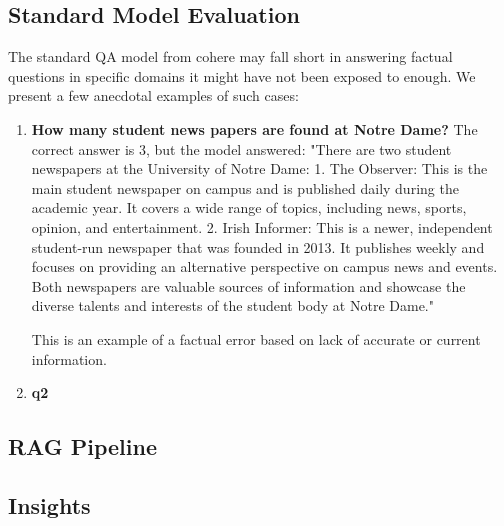 \documentclass[12pt]{article}
\begin{document}
\subsection{Standard Model Evaluation}

The standard QA model from cohere may fall short in answering factual questions in specific domains it might have not been exposed to enough. We present a few anecdotal examples of such cases:

\begin{enumerate}
    \item \textbf{How many student news papers are found at Notre Dame?}
    The correct answer is 3, but the model answered: "There are two student newspapers at the University of Notre Dame: 1. The Observer: This is the main student newspaper on campus and is published daily during the academic year. It covers a wide range of topics, including news, sports, opinion, and entertainment. 2. Irish Informer: This is a newer, independent student-run newspaper that was founded in 2013. It publishes weekly and focuses on providing an alternative perspective on campus news and events. Both newspapers are valuable sources of information and showcase the diverse talents and interests of the student body at Notre Dame."
    
    This is an example of a factual error based on lack of accurate or current information.
    
    \item \textbf{q2}

\end{enumerate}


\subsection{RAG Pipeline}

\subsection{Insights}

\end{document}
